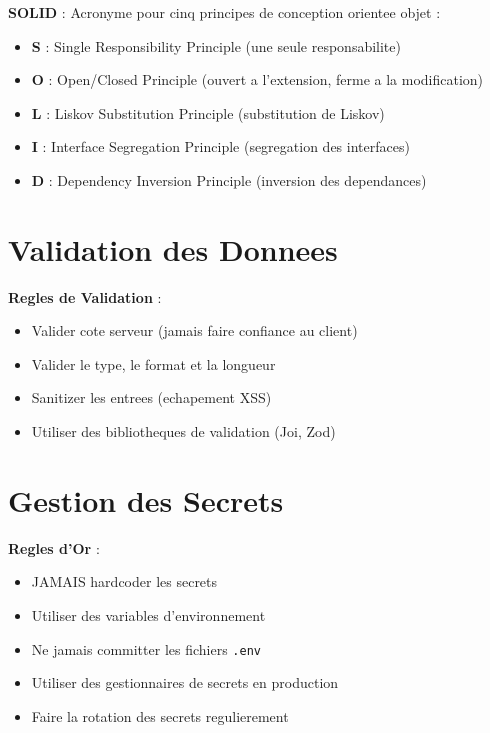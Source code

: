 \documentclass[a4paper,12pt]{book}
\begin{document}
\begin{definitionbox}
    \textbf{SOLID} : Acronyme pour cinq principes de conception orientee objet :
    \begin{itemize}
        \item \textbf{S} : Single Responsibility Principle (une seule responsabilite)
        \item \textbf{O} : Open/Closed Principle (ouvert a l'extension, ferme a la modification)
        \item \textbf{L} : Liskov Substitution Principle (substitution de Liskov)
        \item \textbf{I} : Interface Segregation Principle (segregation des interfaces)
        \item \textbf{D} : Dependency Inversion Principle (inversion des dependances)
    \end{itemize}
\end{definitionbox}

\section{Validation des Donnees}

\begin{bestpracticebox}
    \textbf{Regles de Validation} :
    \begin{itemize}
        \item Valider cote serveur (jamais faire confiance au client)
        \item Valider le type, le format et la longueur
        \item Sanitizer les entrees (echapement XSS)
        \item Utiliser des bibliotheques de validation (Joi, Zod)
    \end{itemize}
\end{bestpracticebox}

\section{Gestion des Secrets}

\begin{securitybox}
    \textbf{Regles d'Or} :
    \begin{itemize}
        \item JAMAIS hardcoder les secrets
        \item Utiliser des variables d'environnement
        \item Ne jamais committer les fichiers \texttt{.env}
        \item Utiliser des gestionnaires de secrets en production
        \item Faire la rotation des secrets regulierement
    \end{itemize}
\end{securitybox}
\end{document}
